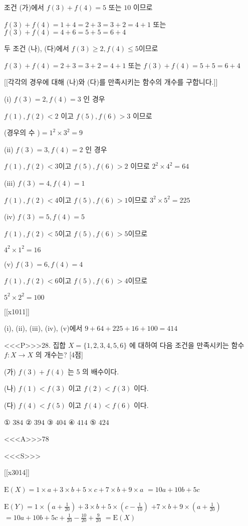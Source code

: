 \documentclass{oblivoir}
\begin{document}
조건 (가)에서 $f(3)+f(4)=5$ 또는 $10$ 이므로

$ f(3)+f(4)=1+4=2+3=3+2=4+1$ 또는 $f(3)+f(4)=4+6=5+5=6+4 $

두 조건 (나), (다)에서 $f(3) \geq 2, f(4) \leq 5 $이므로

$f(3)+f(4)=2+3=3+2=4+1$ 또는 $f(3)+f(4)=5+5=6+4$

[[각각의 경우에 대해 (나)와 (다)를 만족시키는 함수의 개수를 구합니다.]] 

(i) $f(3)=2, f(4)=3$ 인 경우

$f(1), f(2)<2$ 이고 $f(5), f(6)>3$ 이므로

(경우의 수 )$=1^{2} \times 3^{2}=9$

(ii) $f(3)=3, f(4)=2$ 인 경우

$f(1), f(2)<3$이고 $f(5), f(6)>2$ 이므로 $2^{2} \times 4^{2}=64$

(iii) $f(3)=4, f(4)=1$

$f(1), f(2)<4$이고 $f(5), f(6)>1 $이므로 $3^{2} \times 5^{2}=225$

(iv) $f(3)=5, f(4)=5$

$f(1), f(2)<5$이고 $f(5), f(6)>5 $이므로

$4^{2} \times 1^{2}=16$

(v) $f(3)=6, f(4)=4$

$f(1), f(2)<6$이고 $f(5), f(6)>4 $이므로 

$5^{2} \times 2^{2}=100$

[[x1011]]

(i), (ii), (iii), (iv), (v)에서 $ 9+64+225+16+100=414$

<<<P>>>28. 집합 $X=\{1,2,3,4,5,6\}$ 에 대하여 다음 조건을 만족시키는 함수 $f: X \rightarrow X$ 의 개수는? [4점]

(가) $f(3)+f(4)$ 는 5 의 배수이다.

(나) $f(1)<f(3)$ 이고 $f(2)<f(3)$ 이다.

(다) $f(4)<f(5)$ 이고 $f(4)<f(6)$ 이다.

① $384$
② $394$
③ $404$
④ $414$
⑤ $424$


<<<A>>>$78$

<<<S>>>

[[x3014]]

$\mathrm{E}(X)=1 \times a+3 \times b+5 \times c+7 \times b+9 \times a$
$=10 a+10 b+5 c$

$\mathrm{E}(Y)=1 \times\left(a+\frac{1}{20}\right)+3 \times b+5 \times\left(c-\frac{1}{10}\right)$
$+7 \times b+9 \times\left(a+\frac{1}{20}\right)$
$=10 a+10 b+5 c+\frac{1}{20}-\frac{10}{20}+\frac{9}{20}$
$=\mathrm{E}(X)$
\end{document}
